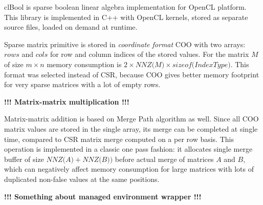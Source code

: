 clBool is sparse boolean linear algebra implementation for OpenCL platform. This library is implemented 
in C++ with OpenCL kernels, stored as separate source files, loaded on demand at runtime. 

Sparse matrix primitive is stored in \textit{coordinate format} COO with two arrays: $rows$ and $cols$ for row 
and column indices of the stored values. For the matrix $M$ of size $m \times n$ memory consumption is 
$2 \times \textit{NNZ(M)} \times \textit{sizeof(IndexType)}$. This format was selected instead of 
CSR, because COO gives better memory footprint for very sparse matrices with a lot of empty rows.

\textbf{!!! Matrix-matrix multiplication !!!}

Matrix-matrix addition is based on Merge Path algorithm as well. Since all COO matrix values are stored in 
the single array, its merge can be completed at single time, compared to CSR matrix merge computed on a 
per row basis. This operation is implemented in a classic one pass fashion: it allocates single merge 
buffer of size $\textit{NNZ(A)} + \textit{NNZ(B)})$ before actual merge of matrices $A$ and $B$, which can
negatively affect memory consumption for large matrices with lots of duplicated non-false values at the 
same positions.

\textbf{!!! Something about managed environment wrapper !!!}
